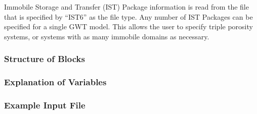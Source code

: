 Immobile Storage and Transfer (IST) Package information is read from the file that is specified by ``IST6'' as the file type.  Any number of IST Packages can be specified for a single GWT model.  This allows the user to specify triple porosity systems, or systems with as many immobile domains as necessary. 

\vspace{5mm}
\subsubsection{Structure of Blocks}



\vspace{5mm}
\subsubsection{Explanation of Variables}
\begin{description}

\end{description}

\vspace{5mm}
\subsubsection{Example Input File}


